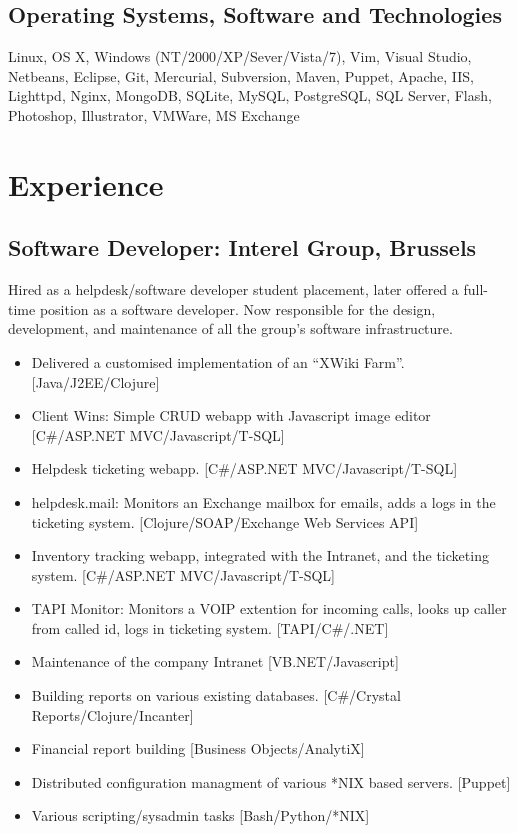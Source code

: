\documentclass{article}
\begin{document}
\subsection*{Operating Systems, Software and Technologies}
\label{sec-2.2}

Linux, OS X, Windows (NT/2000/XP/Sever/Vista/7), Vim, Visual Studio, Netbeans, Eclipse, Git, Mercurial, Subversion, Maven, Puppet, Apache, IIS, Lighttpd, Nginx, MongoDB, SQLite, MySQL, PostgreSQL, SQL Server, Flash, Photoshop, Illustrator, VMWare, MS Exchange
\section*{Experience}
\label{sec-3}

\subsection*{Software Developer: Interel Group, Brussels}
\label{sec-3.1}

Hired as a helpdesk/software developer student placement, later offered a full-time position as a software developer. Now responsible for the design, development, and maintenance of all the group's software infrastructure.
\begin{itemize}
\item Delivered a customised implementation of an ``XWiki Farm''. [Java/J2EE/Clojure]
\item Client Wins: Simple CRUD webapp with Javascript image editor [C\#/ASP.NET MVC/Javascript/T-SQL]
\item Helpdesk ticketing webapp. [C\#/ASP.NET MVC/Javascript/T-SQL]
\item helpdesk.mail: Monitors an Exchange mailbox for emails, adds a logs in the ticketing system. [Clojure/SOAP/Exchange Web Services API]
\item Inventory tracking webapp, integrated with the Intranet, and the ticketing system. [C\#/ASP.NET MVC/Javascript/T-SQL]
\item TAPI Monitor: Monitors a VOIP extention for incoming calls, looks up caller from called id, logs in ticketing system. [TAPI/C\#/.NET]
\item Maintenance of the company Intranet [VB.NET/Javascript]
\item Building reports on various existing databases. [C\#/Crystal Reports/Clojure/Incanter]
\item Financial report building [Business Objects/AnalytiX]
\item Distributed configuration managment of various *NIX based servers. [Puppet]
\item Various scripting/sysadmin tasks [Bash/Python/*NIX]
\end{itemize}
\end{document}
